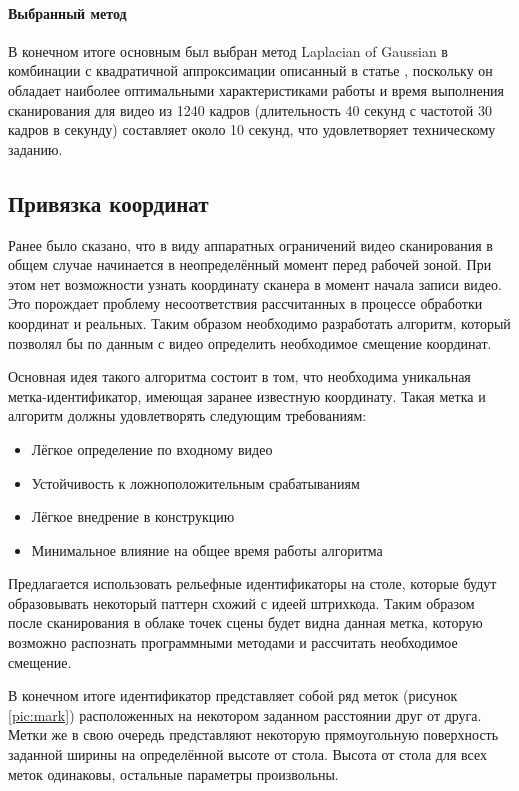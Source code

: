             \paragraph{Выбранный метод}
                В конечном итоге основным был выбран метод Laplacian of Gaussian в комбинации с квадратичной аппроксимации описанный в статье \cite{Molder2014}, поскольку он обладает наиболее оптимальными характеристиками работы и время выполнения сканирования для видео из 1240 кадров (длительность 40 секунд с частотой 30 кадров в секунду) составляет около 10 секунд, что удовлетворяет техническому заданию.
            
        \subsection{Привязка координат}
            Ранее было сказано, что в виду аппаратных ограничений видео сканирования в общем случае начинается в неопределённый момент перед рабочей зоной. При этом нет возможности узнать координату сканера в момент начала записи видео. Это порождает проблему несоответствия рассчитанных в процессе обработки координат и реальных. Таким образом необходимо разработать алгоритм, который позволял бы по данным с видео определить необходимое смещение координат.
            
            Основная идея такого алгоритма состоит в том, что необходима уникальная метка-идентификатор, имеющая заранее известную координату. Такая метка и алгоритм должны удовлетворять следующим требованиям:
            \begin{itemize}
                \item Лёгкое определение по входному видео
                \item Устойчивость к ложноположительным срабатываниям
                \item Лёгкое внедрение в конструкцию
                \item Минимальное влияние на общее время работы алгоритма
            \end{itemize}

            Предлагается использовать рельефные идентификаторы на столе, которые будут образовывать некоторый паттерн схожий с идеей штрихкода. Таким образом после сканирования в облаке точек сцены будет видна данная метка, которую возможно распознать программными методами и рассчитать необходимое смещение.
            
            В конечном итоге идентификатор представляет собой ряд меток (рисунок \ref{pic:mark}) расположенных на некотором заданном расстоянии друг от друга. Метки же в свою очередь представляют некоторую прямоугольную поверхность заданной ширины на определённой высоте от стола. Высота от стола для всех меток одинаковы, остальные параметры произвольны.
            
